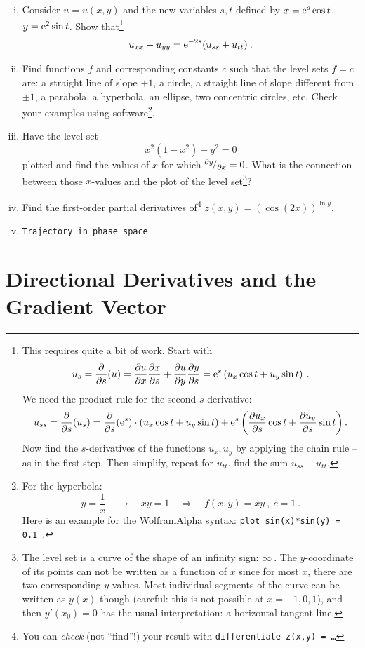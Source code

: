 \begin{exercise}
\begin{enumerate}[(i)]
		\item Consider $u=u(x,y)$ and the new variables $s,t$ defined by $x = \mathrm{e}^s \cos t$, $y = \mathrm{e}^2 \sin t$. Show that\footnote{This requires quite a bit of work. Start with
		\[ u_s = \displaystyle{\frac{\partial }{\partial s}}(u) = \displaystyle{\frac{\partial u}{\partial x}}\displaystyle{\frac{\partial x}{\partial s}} + \displaystyle{\frac{\partial u}{\partial y}}\displaystyle{\frac{\partial y}{\partial s}} 
		= \mathrm{e}^s \left( u_x \cos t + u_y \sin t \right) \:. \]
	We need the product rule for the second $s$-derivative:
	\[ u_{ss} = \displaystyle{\frac{\partial }{\partial s}}(u_s) = \displaystyle{\frac{\partial }{\partial s}} (\mathrm{e}^s) \cdot \left( u_x \cos t + u_y \sin t \right)
	+ \mathrm{e}^s \left( \displaystyle{\frac{\partial u_x}{\partial s}} \cos t + \displaystyle{\frac{\partial u_y}{\partial s}} \sin t \right). \]
	Now find the $s$-derivatives of the functions $u_x,u_y$ by applying the chain rule -- as in the first step. Then simplify, repeat for $u_{tt}$, find the sum $u_{ss}+u_{tt}$.}
		\[ u_{xx} + u_{yy} = \mathrm{e}^{-2s}(u_{ss}+u_{tt}) \:. \]
		\item Find functions $f$ and corresponding constants $c$ such that the level sets $f=c$ are: a straight line of slope $+1$, a circle, a straight line of slope different from $\pm1$, a parabola, a hyperbola, an ellipse, two concentric circles, etc. Check your examples using software\footnote{For the hyperbola:
			\[ y = \frac{1}{x} \quad \longrightarrow \quad xy = 1 \quad \Longrightarrow
			\quad f(x,y)=xy \:,\:c=1 \:. \]
		Here is an example for the WolframAlpha syntax: \texttt{plot sin(x)*sin(y) = 0.1}~.}.
		\item Have the level set
		\[x^2(1-x^2) - y^2 = 0\]
		plotted and find the values of $x$ for which ${}^{\partial y}\!/_{\partial x} = 0$. What is the connection between those $x$-values and the plot of the level set\footnote{The level set is a curve of the shape of an infinity sign: $\infty\:$. The $y$-coordinate of its points can not be written as a function of $x$ since for most $x$, there are two corresponding $y$-values. Most individual segments of the curve can be written as $y(x)$ though (careful: this is not possible at $x=-1,0,1$), and then $y'(x_0)=0$ has the usual interpretation: a horizontal tangent line.}?
		\item Find the first-order partial derivatives of\footnote{You can \emph{check} (not ``find''!) your result with \texttt{differentiate z(x,y) = \ldots}}
		$z(x,y) = \left(\cos(2x)\right)^{\ln y}$.
		\item \texttt{Trajectory in phase space}
	\end{enumerate}
\end{exercise}


\section{Directional Derivatives and the Gradient Vector}

